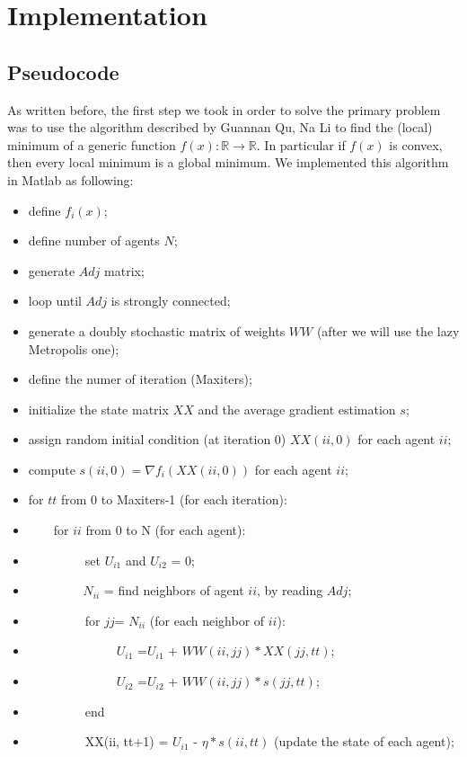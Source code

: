 \documentclass[a4paper,11pt,oneside]{book}
\begin{document}
\chapter{Implementation}
\section{Pseudocode}
As written before, the first step we took in order to solve the primary problem was to use the algorithm described by Guannan Qu, Na Li  to find the (local) minimum of a generic function $f(x): \mathbb{R} \rightarrow \mathbb{R} $. In particular if $f(x)$ is convex, then every local minimum is a global minimum.
We implemented this algorithm in Matlab as following:
\small
{\linespread{0.66}\selectfont
\begin{itemize}
\item[] define $f_{i}(x)$;
\item[] define number of agents $N$;
\item[] generate $Adj$ matrix;
\item[] loop until $Adj$ is strongly connected;
\item[] generate a doubly stochastic matrix of weights $WW$ (after we will use the lazy Metropolis one);
\item[] define the numer of iteration (Maxiters);
\item[] initialize the state matrix $XX$ and the average gradient estimation $s$;
\item[] assign random initial condition (at iteration 0)  $XX(ii,0)$ for each agent $ii$;
\item[] compute $ s(ii,0) = \nabla f_i(XX(ii,0))$ for each agent $ii$;
\item[] for $tt$ from 0 to Maxiters-1 (for each iteration):
\item[] ~~~~for $ii$ from 0 to N (for each agent):
\item[] ~~~~~~~~~set $U_{i1}$ and $U_{i2}$ = 0;
\item[] ~~~~~~~~ $N_{ii}$ = find neighbors of  agent $ii$, by reading $Adj$;
\item[] ~~~~~~~~~for $jj $= $N_{ii}$ (for each neighbor of $ii$):
\item[] ~~~~~~~~~~~~~~$U_{i1}$ =$U_{i1}$ + $WW(ii,jj)*XX(jj,tt)$;
\item[] ~~~~~~~~~~~~~~$U_{i2}$ =$U_{i2}$ + $WW(ii,jj)*s(jj,tt)$;
\item[] ~~~~~~~~~end
\item[] ~~~~~~~~~XX(ii, tt+1) = $U_{i1}$ - $\eta*s(ii,tt)$ (update the state of each agent);

\end{itemize}}
\end{document}
